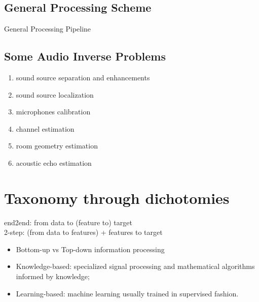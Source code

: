 \subsection{General Processing Scheme}
General Processing Pipeline

\subsection{Some Audio Inverse Problems}
\begin{enumerate}
    \item sound source separation and enhancements
    \item sound source localization
    \item microphones calibration
    \item channel estimation
    \item room geometry estimation
    \item acoustic echo estimation
\end{enumerate}

\section{Taxonomy through dichotomies}
end2end: from data to (feature to) target
\\2-step: (from data to features) + features to target

\begin{itemize}
    \item Bottom-up vs Top-down information processing
    \item Knowledge-based: specialized signal processing and mathematical algorithms informed by knowledge;
    \item Learning-based: machine learning usually trained in supervised fashion.
\end{itemize}

